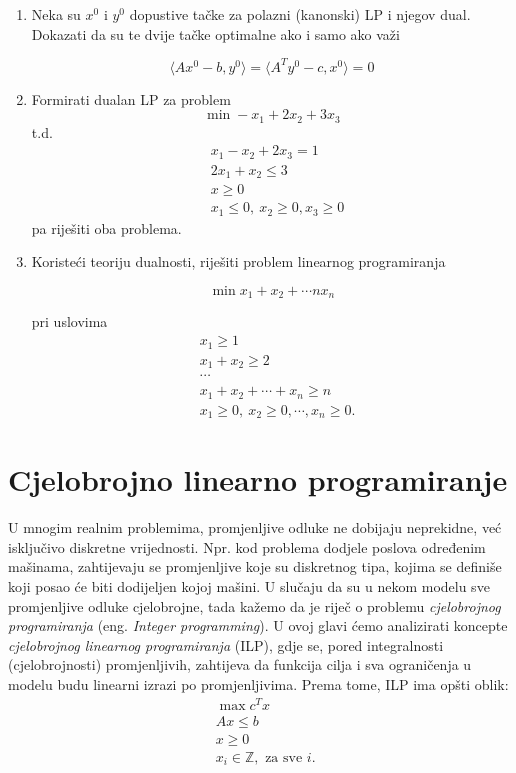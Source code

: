 \documentclass[a4paper, utf8, 11pt, colorlinks]{book}
\theoremstyle{definition}
\begin{document}
\begin{enumerate}
\item Neka su $x^0$ i $y^0$ dopustive tačke za polazni (kanonski) LP i njegov dual. Dokazati da su te dvije tačke optimalne ako i samo ako važi 

$$\langle Ax^0-b,y^0\rangle=\langle A^Ty^0-c,x^0\rangle=0$$

\item Formirati dualan LP za problem
$$\min -x_1+2x_2+3x_3$$
t.d.
\begin{align}
	& x_1-x_2+2x_3=1\nonumber\\
	& 2x_1+x_2\leqslant 3\nonumber \\
	& x \geq 0\nonumber \\
	& x_1\leqslant 0,\ x_2\geqslant 0, x_3\geqslant 0 \nonumber
\end{align}
pa riješiti oba problema.

\item Koristeći teoriju dualnosti, riješiti problem linearnog programiranja

$$\min x_1+x_2+\cdots nx_n$$

pri uslovima
$$
\begin{aligned}
	& x_1\geqslant 1\\
	& x_1+x_2\geqslant 2 \\
	& \cdots\\
	& x_1+x_2+\cdots+x_n\geqslant n\\
	&x_1\geqslant 0,\ x_2\geqslant 0,\cdots,x_n\geqslant 0.
\end{aligned}$$
\end{enumerate}
\chapter{Cjelobrojno linearno programiranje}\label{chp:ilp}

U mnogim realnim problemima, promjenljive odluke ne dobijaju neprekidne, već isključivo diskretne vrijednosti. Npr. kod problema dodjele poslova određenim mašinama, zahtijevaju se promjenljive koje su diskretnog tipa, kojima se definiše koji posao će biti dodijeljen kojoj mašini. U slučaju da su u nekom modelu sve promjenljive odluke cjelobrojne, tada kažemo da je riječ o problemu \emph{cjelobrojnog programiranja} (eng. \emph{Integer programming}). 
U ovoj glavi ćemo analizirati koncepte   \emph{cjelobrojnog linearnog programiranja} (ILP), gdje se, pored integralnosti (cjelobrojnosti) promjenljivih, zahtijeva da funkcija cilja  i sva ograničenja u modelu budu linearni izrazi po promjenljivima. Prema tome, ILP ima opšti oblik:
\begin{align}
    & \max c^T x \nonumber\\
    & A x \leq b \nonumber \\
    & x \geq 0 \nonumber\\
    & x_i \in \mathbb{Z}, \mbox{ za sve } i. \label{ilp-formulation}
\end{align}
\end{document}
